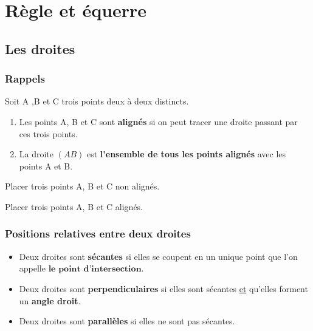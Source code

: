 \documentclass[a4paper]{book}
\begin{document}
\setcounter{chapter}{4}
\renewcommand{\monTitre}{Règle et équerre}
\chapter{\monTitre}
\thispagestyle{fancy}

\section{Les droites}
\subsection{Rappels}
    \begin{definition}
        Soit A ,B et C trois points deux à deux distincts.
        \begin{enumerate}
            \item Les points A, B et C sont \textbf{alignés} si on peut tracer une droite passant par ces trois points.
            \item La droite $(AB)$ est \textbf{l'ensemble de tous les points alignés} avec les points A et B.
        \end{enumerate}
    \end{definition}


    \begin{exemple}
        \begin{minipage}{0.5\linewidth}
            Placer trois points A, B et C non alignés.

            \vspace{2cm}
        \end{minipage}
        \vline
        \hfill
        \begin{minipage}{0.49\linewidth}
            Placer trois points A, B et C alignés.

            \vspace{2cm}
        \end{minipage}
    \end{exemple}


\subsection{Positions relatives entre deux droites}

    \begin{definition}
        \begin{itemize}
            \item Deux droites sont \textbf{sécantes} si elles se coupent en un unique point que l'on appelle $\textbf{le point d'intersection}$.

            \item Deux droites sont \textbf{perpendiculaires} si elles sont sécantes \underline{et} qu'elles forment un \textbf{angle droit}.

            \item Deux droites sont \textbf{parallèles} si elles ne sont pas sécantes.
        \end{itemize}
    \end{definition}
\end{document}
